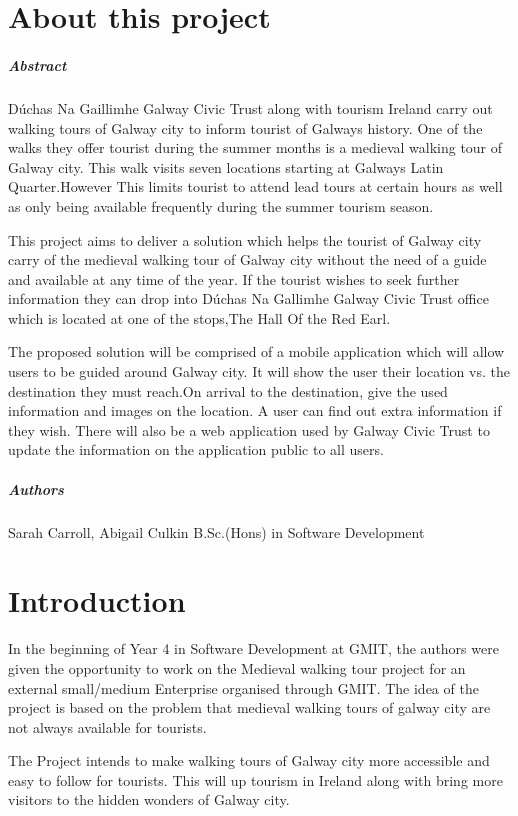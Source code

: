 
\chapter*{About this project}
\paragraph{Abstract}

Dúchas Na Gaillimhe Galway Civic Trust along with tourism Ireland carry out walking tours of Galway city to inform tourist of Galways history. One of the walks they offer tourist during the summer months is a medieval walking tour of Galway city. This walk visits seven locations starting at Galways Latin Quarter.However This limits tourist to attend lead tours at certain hours as well as only being available frequently during the summer tourism season.

This project aims to deliver a solution which helps the tourist of Galway city carry of the medieval walking tour of Galway city without the 
need of a guide and available at any time of the year. If the tourist wishes to seek further information they can drop into Dúchas Na Gallimhe Galway Civic Trust office which is located at one of the stops,The Hall Of the Red Earl.

The proposed solution will be comprised of a mobile application which will allow users to be guided around Galway city. It will show the user their location vs. the destination they must reach.On arrival to the destination, give the used information and images on the location. A user can find out extra information if they wish. There will also be a web application used by Galway Civic Trust to update the information on the application public to all users.

\paragraph{Authors}
Sarah Carroll, Abigail Culkin
B.Sc.(Hons) in Software Development

\chapter{Introduction}

In the beginning of Year 4 in Software Development at GMIT, the authors were given the opportunity to work on the Medieval walking tour project for an external small/medium Enterprise organised through GMIT. The idea of the project is based on the problem that medieval walking tours of galway city are not always available for tourists. 

The Project intends to make walking tours of Galway city more accessible and easy to follow for tourists. This will up tourism in Ireland along with bring more visitors to the hidden wonders of Galway city.